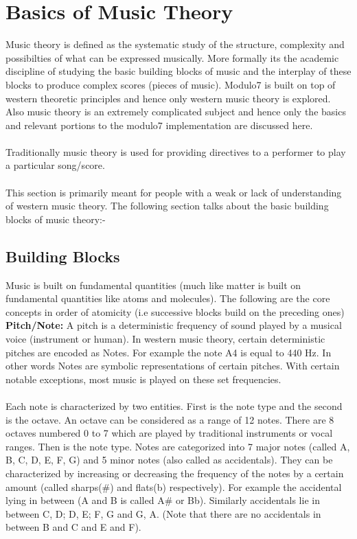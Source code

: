 \chapter{Basics of Music Theory}
\label{sec:music theory}

\noindent Music theory is defined as the systematic study of the structure, complexity and possibilties of what can be expressed musically. More formally its the academic discipline of studying the basic building blocks of music and the interplay of these blocks to produce complex scores (pieces of music). Modulo7 is built on top of western theoretic principles and hence only western music theory is explored. Also music theory is an extremely complicated subject and hence only the basics and relevant portions to the modulo7 implementation are discussed here. \\\\
Traditionally music theory is used for providing directives to a performer to play a particular song/score. \\\\
This section is primarily meant for people with a weak or lack of understanding of western music theory. 
The following section talks about the basic building blocks of music theory:-
\section{Building Blocks}

\noindent Music is built on fundamental quantities (much like matter is built on fundamental quantities like atoms and molecules). The following are the core concepts in order of atomicity (i.e successive blocks build on the preceding ones)\\

\noindent \textbf{Pitch/Note: } A pitch is a deterministic frequency of sound played by a musical voice (instrument or human). In western music theory, certain deterministic pitches are encoded as Notes. For example the note A4 is equal to 440 Hz. In other words Notes are symbolic representations of certain pitches. With certain notable exceptions, most music is played on these set frequencies. \\\\
Each note is characterized by two entities. First is the note type and the second is the octave. An octave can be considered as a range of 12 notes. There are 8 octaves numbered 0 to 7 which are played by traditional instruments or vocal ranges. Then is the note type. Notes are categorized into 7 major notes (called A, B, C, D, E, F, G) and 5 minor notes (also called as accidentals). They can be characterized by increasing or decreasing the frequency of the notes by a certain amount (called sharps(\#) and flats(b) respectively). For example the accidental lying in between (A and B is called A\# or Bb). Similarly accidentals lie in between C, D; D, E; F, G and G, A. (Note that there are no accidentals in between B and C and E and F). \\

